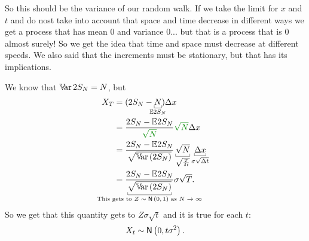 \documentclass{report}
\begin{document}
So this should be the variance of our random walk. If we take the limit for $x$ and $t$ and do nost take into account that space and time decrease in different ways we get a process that has mean 0 and variance 0... but that is a process that is 0 almost surely! So we get the idea that time and space must decrease at different speeds. We also said that the increments must be stationary, but that has its implications.
\begin{remark}
	We know that $\mathbb{V}\!\mathrm{ar}\, 2S_{N}=N$, but
	\begin{align*}
		X_{T}&=(2S_{N}-\ubracketthin{N}_{\mathclap{\ev 2 S_{N}}})\Delta x\\
		&=\frac{2 S_{N}-\ev 2 S_{N}}{\mathcolor{Green4}{\sqrt{N}}}\mathcolor{Green4}{\sqrt{N}}\Delta x\\
		&=\frac{2S_{N}-\ev 2 S_{N}}{\sqrt{\var(2S_{N})}}\ubracketthin{\sqrt{N}}_{\sqrt{\frac{T}{\delta t}}}\ubracketthin{\Delta x}_{{\sigma\sqrt{\Delta t}}}\\
		&=\frac{2S_{N}-\ev 2 S_{N}}{\ubracketthin{\sqrt{\var(2S_{N})}}_{\claptext{This gets to $Z\distnorm{0,1}$ as $N\to\infty$}}}\sigma\sqrt{T}.
	\end{align*}
	So we get that this quantity gets to $Z\sigma\sqrt{t}$ and it is true for each $t$:
	\begin{equation*}
		X_{t}\sim\mathsf{N}\left(0,t\sigma^{2}\right).
	\end{equation*}
\end{remark}
\end{document}
